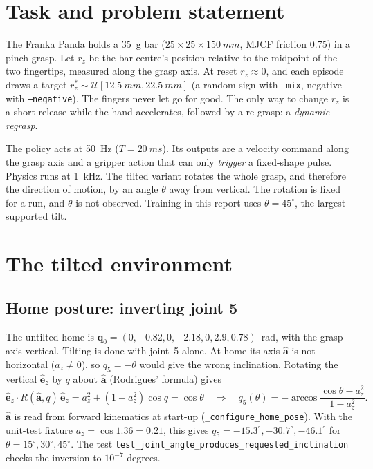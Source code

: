 \documentclass[10.5pt,a4paper]{article}
\newcommand{\code}[1]{\texttt{#1}}
\begin{document}
\tableofcontents

\section{Task and problem statement}
The Franka Panda holds a \SI{35}{g} bar ($25\times25\times\SI{150}{mm}$, MJCF friction 0.75) in a pinch grasp.
Let $r_z$ be the bar centre's position relative to the midpoint of the two fingertips, measured along the grasp
axis. At reset $r_z\approx0$, and each episode draws a target
$r_z^*\sim\mathcal U[\SI{12.5}{mm},\SI{22.5}{mm}]$ (a random sign with \code{--mix}, negative with
\code{--negative}). The fingers never let go for good. The only way to change $r_z$ is a short release while
the hand accelerates, followed by a re-grasp: a \emph{dynamic regrasp}.

The policy acts at \SI{50}{Hz} ($T=\SI{20}{ms}$). Its outputs are a velocity command along the grasp axis and
a gripper action that can only \emph{trigger} a fixed-shape pulse. Physics runs at \SI{1}{kHz}. The tilted
variant rotates the whole grasp, and therefore the direction of motion, by an angle $\theta$ away from vertical.
The rotation is fixed for a run, and $\theta$ is not observed. Training in this report uses $\theta=45^\circ$,
the largest supported tilt.

\section{The tilted environment}
\subsection{Home posture: inverting joint 5}
The untilted home is $\bm q_0=(0,-0.82,0,-2.18,0,2.9,0.78)$~rad, with the grasp axis vertical. Tilting is done
with joint~5 alone. At home its axis $\hat{\bm a}$ is not horizontal ($a_z\neq0$), so $q_5=-\theta$ would give
the wrong inclination. Rotating the vertical $\hat{\bm e}_z$ by $q$ about $\hat{\bm a}$ (Rodrigues' formula)
gives
\begin{equation}
\hat{\bm e}_z\!\cdot\! R(\hat{\bm a},q)\,\hat{\bm e}_z=a_z^2+(1-a_z^2)\cos q=\cos\theta
\quad\Longrightarrow\quad
q_5(\theta)=-\arccos\frac{\cos\theta-a_z^2}{1-a_z^2}.
\end{equation}
$\hat{\bm a}$ is read from forward kinematics at start-up (\code{\_configure\_home\_pose}). With the unit-test
fixture $a_z=\cos1.36=0.21$, this gives $q_5=-15.3^\circ,-30.7^\circ,-46.1^\circ$ for
$\theta=15^\circ,30^\circ,45^\circ$. The test \code{test\_joint\_angle\_produces\_requested\_inclination} checks
the inversion to $10^{-7}$ degrees.
\end{document}
